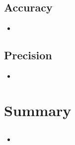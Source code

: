 \documentclass{scrartcl}
\begin{document}
\subsection{Accuracy}
\begin{itemize}
\item
\end{itemize}

\subsection{Precision}
\begin{itemize}
\item
\end{itemize}

\section{Summary}
\subsection{}
\begin{itemize}
\item
\end{itemize}








%




\end{document}
